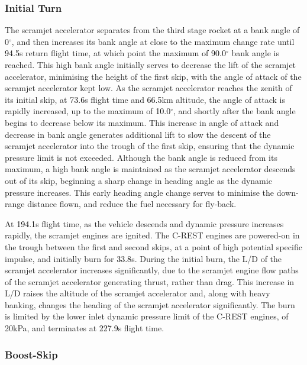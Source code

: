\subsubsection{ Initial Turn}
The scramjet accelerator separates from the third stage rocket at a bank angle of 0$^\circ$, and then increases its bank angle at close to the maximum change rate until \textcolor{black}{94.5}s return flight time, at which point \textcolor{black}{ the maximum of 90.0}$^\circ$ bank angle is reached. This high bank angle initially serves to decrease the lift of the scramjet accelerator, minimising the height of the first skip, with the angle of attack of the scramjet accelerator kept low. As the scramjet accelerator reaches the zenith of its initial skip, at \textcolor{black}{73.6}s flight time and \textcolor{black}{66.5}km altitude, the angle of attack is rapidly increased, up to the maximum of \textcolor{black}{10.0}$^\circ$, and shortly after the bank angle begins to decrease below its maximum. This increase in angle of attack and decrease in bank angle generates additional lift to slow the descent of the scramjet accelerator into the trough of the first skip, ensuring that the dynamic pressure limit is not exceeded. 
Although the bank angle is reduced from its maximum, a high bank angle is maintained as the scramjet accelerator descends out of its skip, beginning a sharp change in heading angle as the dynamic pressure increases. 
This early heading angle change serves to minimise the down-range distance flown, and reduce the fuel necessary for fly-back. 


At \textcolor{black}{194.1}s flight time, as the vehicle descends and dynamic pressure increases rapidly, the scramjet engines are ignited. The C-REST engines are powered-on in the trough between the first and second skips, at a point of high potential specific impulse, and initially burn for \textcolor{black}{33.8}s. During the initial burn, the L/D of the scramjet accelerator increases significantly, due to the scramjet engine flow paths of the scramjet accelerator generating thrust, rather than drag. 
This increase in L/D raises the altitude of the scramjet accelerator and, along with heavy banking, changes the heading of the scramjet accelerator significantly. 
The burn is limited by the lower inlet dynamic pressure limit of the C-REST engines, of 20kPa, and terminates at \textcolor{black}{227.9}s flight time. 

\subsubsection{ Boost-Skip}\label{sec:boost}

